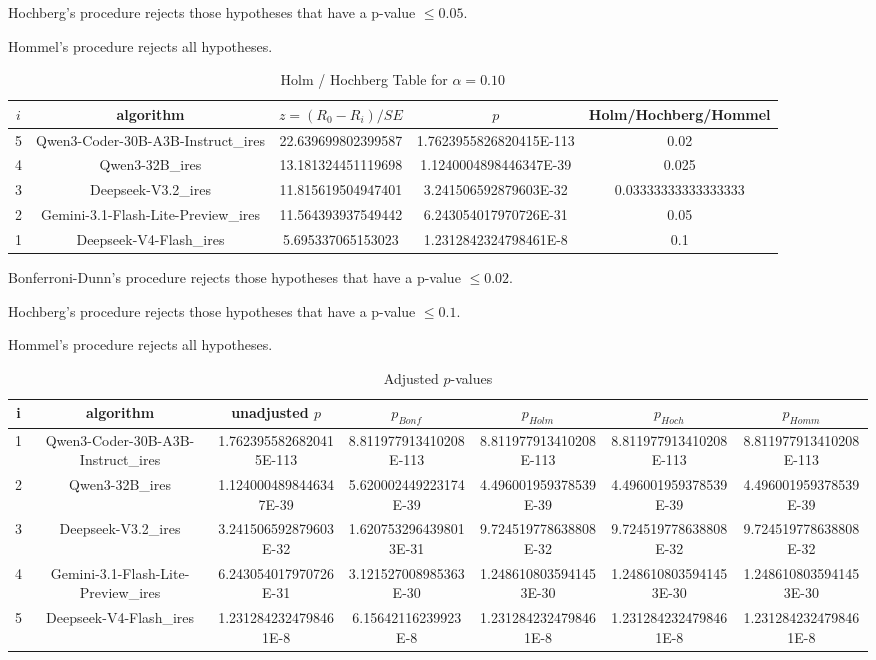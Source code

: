 \documentclass[a4paper,10pt]{article}
\begin{document}
\begin{landscape}
Hochberg's procedure rejects those hypotheses that have a p-value $\le0.05$.


Hommel's procedure rejects all hypotheses.


\begin{table}[!htp]
\centering\tiny
\caption{Holm / Hochberg Table for $\alpha=0.10$}
\begin{tabular}{ccccc}
$i$&algorithm&$z=(R_0 - R_i)/SE$&$p$&Holm/Hochberg/Hommel\\
\hline
5&Qwen3-Coder-30B-A3B-Instruct_ires&22.639699802399587&1.7623955826820415E-113&0.02\\
4&Qwen3-32B_ires&13.181324451119698&1.1240004898446347E-39&0.025\\
3&Deepseek-V3.2_ires&11.815619504947401&3.241506592879603E-32&0.03333333333333333\\
2&Gemini-3.1-Flash-Lite-Preview_ires&11.564393937549442&6.243054017970726E-31&0.05\\
1&Deepseek-V4-Flash_ires&5.695337065153023&1.2312842324798461E-8&0.1\\
\hline
\end{tabular}
\end{table}
Bonferroni-Dunn's procedure rejects those hypotheses that have a p-value $\le0.02$.


Hochberg's procedure rejects those hypotheses that have a p-value $\le0.1$.


Hommel's procedure rejects all hypotheses.


\begin{table}[!htp]
\centering\tiny
\caption{Adjusted $p$-values}
\begin{tabular}{ccccccc}
i&algorithm&unadjusted $p$&$p_{Bonf}$&$p_{Holm}$&$p_{Hoch}$&$p_{Homm}$\\
\hline
1&Qwen3-Coder-30B-A3B-Instruct_ires&1.7623955826820415E-113&8.811977913410208E-113&8.811977913410208E-113&8.811977913410208E-113&8.811977913410208E-113\\
2&Qwen3-32B_ires&1.1240004898446347E-39&5.620002449223174E-39&4.496001959378539E-39&4.496001959378539E-39&4.496001959378539E-39\\
3&Deepseek-V3.2_ires&3.241506592879603E-32&1.6207532964398013E-31&9.724519778638808E-32&9.724519778638808E-32&9.724519778638808E-32\\
4&Gemini-3.1-Flash-Lite-Preview_ires&6.243054017970726E-31&3.121527008985363E-30&1.2486108035941453E-30&1.2486108035941453E-30&1.2486108035941453E-30\\
5&Deepseek-V4-Flash_ires&1.2312842324798461E-8&6.15642116239923E-8&1.2312842324798461E-8&1.2312842324798461E-8&1.2312842324798461E-8\\
\hline
\end{tabular}
\end{table}


\end{landscape}
\end{document}
